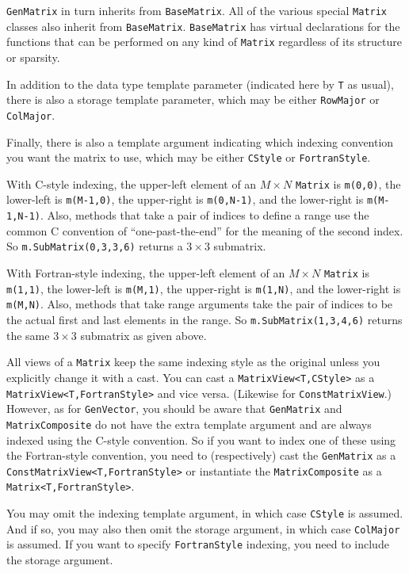 \documentclass[twoside,letterpaper,11pt]{article}
\renewcommand{\tt}[1]{{\texttt {#1}}}
\begin{document}
\tt{GenMatrix} in turn inherits from \tt{BaseMatrix}.  All of the various
special \tt{Matrix} classes also inherit from \tt{BaseMatrix}.
\tt{BaseMatrix} has virtual declarations for the functions that can be 
performed on any kind of \tt{Matrix} regardless of its structure or sparsity.

In addition to the data type template parameter (indicated here by \tt{T} as usual),
there is also a storage template parameter, which may be either 
\tt{RowMajor} or \tt{ColMajor}.

Finally, there is also a template argument indicating which indexing convention
you want the matrix to use, which may be either \tt{CStyle} or 
\tt{FortranStyle}.

With C-style indexing, the upper-left element of an $M \times N$ \tt{Matrix} is
\tt{m(0,0)}, the lower-left is \tt{m(M-1,0)}, the upper-right is \tt{m(0,N-1)},
and the lower-right is \tt{m(M-1,N-1)}.  Also, methods that take a pair of 
indices to define a range use the common C convention of ``one-past-the-end'' 
for the meaning of the second index.
So \tt{m.SubMatrix(0,3,3,6)} returns a $3 \times 3$ submatrix.

With Fortran-style indexing, the upper-left element of an $M \times N$ \tt{Matrix}
is \tt{m(1,1)}, the lower-left is \tt{m(M,1)}, the upper-right is \tt{m(1,N)},
and the lower-right is \tt{m(M,N)}.  Also, methods that take range arguments
take the pair of indices to be the actual first and last elements in the range.
So \tt{m.SubMatrix(1,3,4,6)} returns the same $3 \times 3$ submatrix as given above.

All views of a \tt{Matrix} keep the same indexing style as the original unless you
explicitly change it with a cast.  You can cast a \tt{MatrixView<T,CStyle>}
as a \tt{MatrixView<T,FortranStyle>} and vice versa.  (Likewise for 
\tt{ConstMatrixView}.)  However, as for \tt{GenVector}, you should be
aware that \tt{GenMatrix}
and \tt{MatrixComposite} do not have the extra template argument and are always
indexed using the C-style convention.  So if you want to index one of these 
using the Fortran-style convention, you need to (respectively) cast the 
\tt{GenMatrix} as a \tt{ConstMatrixView<T,FortranStyle>} or instantiate the
\tt{MatrixComposite} as a \tt{Matrix<T,FortranStyle>}.

You may omit the indexing template argument, in which case \tt{CStyle} is assumed.
And if so, you may also then omit the storage argument, in which case \tt{ColMajor}
is assumed.  If you want to specify \tt{FortranStyle} indexing, you need
to include the storage argument.
\end{document}
